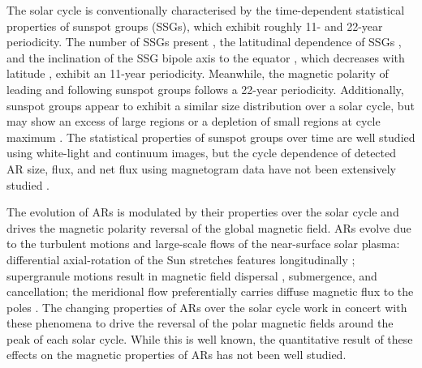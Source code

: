 \documentclass[namedreferences]{solarphysics}
\begin{document}
\begin{article}

The solar cycle is conventionally characterised by the time-dependent statistical properties of sunspot groups (SSGs), which exhibit roughly 11- and 22-year periodicity. The number of SSGs present \citep[sunspot number][]{Schwabe:1844,Wolf:1861}, the latitudinal dependence of SSGs \citep[Sp$\ddot{\mbox{o}}$rer's law][]{Maunder:1904}, and the inclination of the SSG bipole axis to the equator \cite[Joy's Law][]{Hale:1919}, which decreases with latitude \citep{Howard:1991}, exhibit an 11-year periodicity. Meanwhile, the magnetic polarity of leading and following sunspot groups \citep[Hale's law;][]{Hale:1919} follows a 22-year periodicity. Additionally, sunspot groups appear to exhibit a similar size distribution over a solar cycle\citep{harvey:1993}, but may show an excess of large regions or a depletion of small regions at cycle maximum \citep{tang:1984,Hathaway:2010b,Lefevre:2011,Kilcik:2011,deToma:2013}. The statistical properties of sunspot groups over time are well studied using white-light and continuum images, but the cycle dependence of detected AR size, flux, and net flux using magnetogram data have not been extensively studied \citep{meunier:2003,zharkov:2006}. 

The evolution of ARs is modulated by their properties over the solar cycle and drives the magnetic polarity reversal of the global magnetic field. 
ARs evolve due to the turbulent motions and large-scale flows of the near-surface solar plasma: differential axial-rotation of the Sun stretches features longitudinally \citep{Babcock:1961}; supergranule motions result in magnetic field dispersal \citep{Leighton:1964}, submergence, and cancellation; the meridional flow preferentially carries diffuse magnetic flux to the poles \cite{Mosher:1977}. The changing properties of ARs over the solar cycle work in concert with these phenomena to drive the reversal of the polar magnetic fields around the peak of each solar cycle. While this is well known, the quantitative result of these effects on the magnetic properties of ARs has not been well studied.


\end{article}
\end{document}

